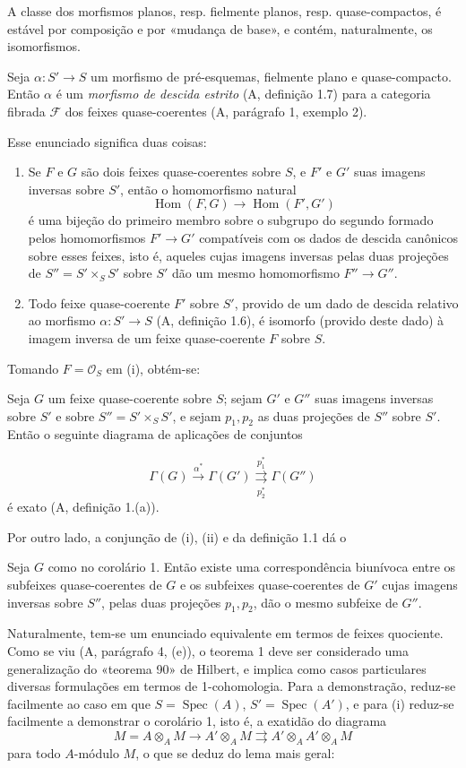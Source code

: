 A classe dos morfismos planos, resp. fielmente planos, resp. quase-compactos,
é estável por composição e por «mudança de base», e contém, naturalmente,
os isomorfismos.

 Seja $\alpha:S'\longrightarrow S$ um morfismo de
pré-esquemas, fielmente plano e quase-compacto. Então $\alpha$ é um
\emph{morfismo de descida estrito} (A, definição 1.7) para a categoria
fibrada $\mathcal F$ dos feixes quase-coerentes (A, parágrafo 1, exemplo 2).

Esse enunciado significa duas coisas:
\begin{enumerate}
\item[(i)] Se $F$ e $G$ são dois feixes quase-coerentes sobre $S$, e $F'$ e
$G'$ suas imagens inversas sobre $S'$, então o homomorfismo natural
\[
  \operatorname{Hom}(F,G)\longrightarrow\operatorname{Hom}(F',G')
\]
é uma bijeção do primeiro membro sobre o subgrupo do segundo formado pelos
homomorfismos $F'\longrightarrow G'$ compatíveis com os dados de descida
canônicos sobre esses feixes, isto é, aqueles cujas imagens inversas pelas
duas projeções de $S''=S'\times_SS'$ sobre $S'$ dão um mesmo
homomorfismo $F''\longrightarrow G''$.
\item[(ii)] Todo feixe quase-coerente $F'$ sobre $S'$, provido de um dado de
descida relativo ao morfismo $\alpha:S'\longrightarrow S$
(A, definição 1.6), é isomorfo (provido deste dado) à imagem inversa de
um feixe quase-coerente $F$ sobre $S$.
\end{enumerate}
Tomando $F=\mathcal O_S$ em (i), obtém-se:

 Seja $G$ um feixe quase-coerente sobre $S$; sejam
$G'$ e $G''$ suas imagens inversas sobre $S'$ e sobre
$S''=S'\times_SS'$, e sejam $p_1,p_2$ as duas projeções de $S''$ sobre
$S'$. Então o seguinte diagrama de aplicações de conjuntos

\[
  \Gamma(G)\xrightarrow{\alpha^*}\Gamma(G')
  \underset{p_2^*}{\overset{p_1^*}{\rightrightarrows}}\Gamma(G'')
\]
é exato (A, definição 1.(a)).

Por outro lado, a conjunção de (i), (ii) e da definição 1.1 dá o

 Seja $G$ como no corolário 1. Então existe uma
correspondência biunívoca entre os subfeixes quase-coerentes de $G$ e os
subfeixes quase-coerentes de $G'$ cujas imagens inversas sobre $S''$, pelas
duas projeções $p_1,p_2$, dão o mesmo subfeixe de $G''$.

Naturalmente, tem-se um enunciado equivalente em termos de feixes quociente.
Como se viu (A, parágrafo 4, (e)), o teorema 1 deve ser considerado uma
generalização do «teorema 90» de Hilbert, e implica como casos particulares
diversas formulações em termos de 1-cohomologia. Para a demonstração, reduz-se
facilmente ao caso em que $S=\operatorname{Spec}(A)$,
$S'=\operatorname{Spec}(A')$, e para (i) reduz-se facilmente a demonstrar o
corolário 1, isto é, a exatidão do diagrama
\[
  M=A\otimes_A M\longrightarrow A'\otimes_A M
  \rightrightarrows A'\otimes_AA'\otimes_A M
\]
para todo $A$-módulo $M$, o que se deduz do lema mais geral:

